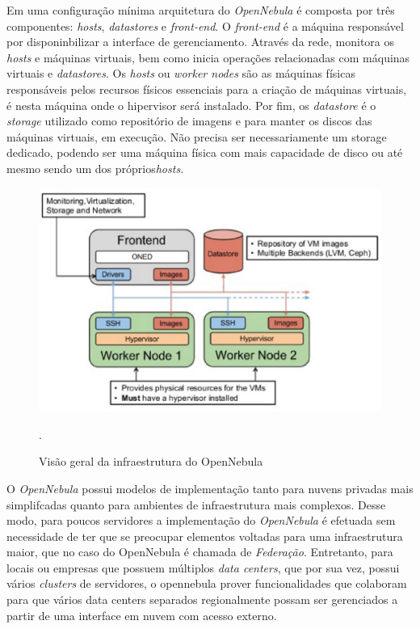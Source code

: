 Em uma configuração mínima  arquitetura do \textit{OpenNebula} é composta por três componentes: \textit{hosts}, \textit{datastores} e \textit{front-end}. O \textit{front-end} é a máquina responsável por disponinbilizar a interface de gerenciamento. Através da rede, monitora os \textit{hosts} e máquinas virtuais, bem como inicia operações relacionadas com máquinas virtuais e \textit{datastores}. Os \textit{hosts} ou \textit{worker nodes} são as máquinas físicas responsáveis pelos recursos físicos essenciais para a criação de máquinas virtuais, é nesta máquina onde o hipervisor será instalado. Por fim, os \textit{datastore} é o \textit{storage} utilizado como repositório de imagens e para manter os discos das máquinas virtuais, em execução. Não precisa ser necessariamente um storage dedicado, podendo ser uma máquina física com mais capacidade de disco ou até mesmo sendo um dos próprios\textit{hosts}.  


\begin{figure}[!htb]
\centering
\includegraphics [keepaspectratio=true,scale=0.60]{figuras/opennebula_instalation.eps}
\caption{Visão geral da infraestrutura do OpenNebula}
\cite{opennebula}.
\label{diagramaopennebula}
\end{figure}




O \textit{OpenNebula} possui modelos de implementação tanto para nuvens privadas mais simplifcadas quanto para ambientes de infraestrutura mais complexos. Desse modo, para poucos servidores a implementação do \textit{OpenNebula} é efetuada sem necessidade de ter que se preocupar elementos voltadas para uma infraestrutura maior, que no caso do OpenNebula é chamada de \textit{Federação}. Entretanto, para locais ou empresas que possuem múltiplos \textit{data centers}, que por sua vez, possui vários \textit{clusters} de servidores, o opennebula prover funcionalidades que colaboram para que vários data centers separados regionalmente possam ser gerenciados a partir de uma interface em nuvem com acesso externo. 

